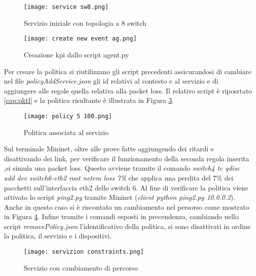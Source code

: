 \begin{figure}[h]
    \centering
   \texttt{[image: service sw8.png]}
    \caption{Servizio iniziale con topologia a 8 switch}
    \label{fig:sw8}
\end{figure}
\begin{figure}[h]
    \centering
   \texttt{[image: create new event ag.png]}
    \caption{Creazione kpi dallo script agent.py}
    \label{fig:ag}
\end{figure}
\newline Per creare la politica si riutilizzano gli script precedenti assicurandosi di cambiare nel file \textit{policyAddService.json}
gli id relativi al contesto e al servizio e di aggiungere alle regole quella relativa alla packet loss. Il relativo script è riposrtato \ref{cap:pktl} e
la politica risultante è illustrata in Figura \ref{fig:policy}.
\begin{figure}[h]
    \centering
   \texttt{[image: policy 5 100.png]}
    \caption{Politica associata al servizio}
    \label{fig:policy}
\end{figure}
\newline Sul terminale Mininet, oltre alle prove fatte aggiungendo dei ritardi e disattivando dei link, 
per verificare il funzionamento della seconda regola inserita ,si simula una packet loss.
Questo avviene tramite il comando
\textit{switch4 tc qdisc add dev switch6-eth2 root netem loss 7\%}
che applica una perdita del 7\% dei pacchetti sull'interfaccia eth2 dello switch 6.
Al fine di verificare la politica viene attivato lo script \textit{ping2.py} tramite Mininet
(\textit{client python ping2.py 10.0.0.2}).
Anche in questo caso si è riscontato un cambiamento nel persorso come mostrato in Figura \ref{fig:sw8 dopo}.
Infine tramite i comandi esposti in precendenza, cambiando nello script \textit{removePolicy.json} l'identificativo della politica, si sono disattivati in ordine la politica, il servizio e i dispositivi.
\begin{figure}[h]
    \centering
   \texttt{[image: servizion constraints.png]}
    \caption{Servizio con cambiamento di percorso}
    \label{fig:sw8 dopo}
\end{figure}

